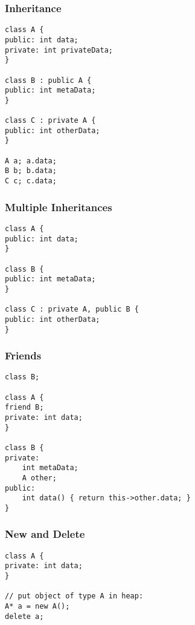\begin{frame}[fragile]
    \frametitle{Inheritance}
    \begin{lstlisting}
class A {
public: int data;
private: int privateData;
}

class B : public A {
public: int metaData;
}

class C : private A {
public: int otherData;
}

A a; a.data;
B b; b.data;
C c; c.data;
    \end{lstlisting}
\end{frame}

\begin{frame}[fragile]
    \frametitle{Multiple Inheritances}
    \begin{lstlisting}
class A {
public: int data;
}

class B {
public: int metaData;
}

class C : private A, public B {
public: int otherData;
}
    \end{lstlisting}
\end{frame}

\begin{frame}[fragile]
    \frametitle{Friends}
    \begin{lstlisting}
class B;

class A {
friend B;
private: int data;
}

class B {
private:
    int metaData;
    A other;
public:
    int data() { return this->other.data; }
}
    \end{lstlisting}
\end{frame}

\begin{frame}[fragile]
    \frametitle{New and Delete}
    \begin{lstlisting}
class A {
private: int data;
}

// put object of type A in heap:
A* a = new A();
delete a;
    \end{lstlisting}
\end{frame}


